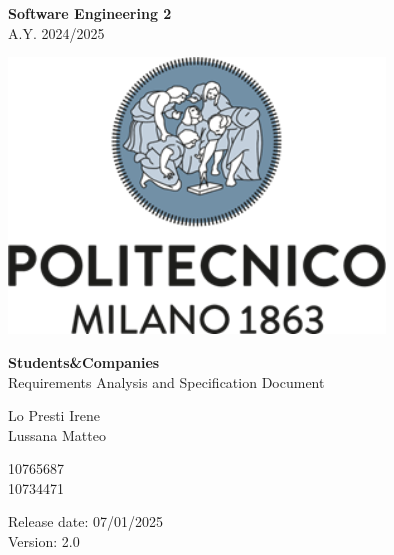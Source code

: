 \documentclass{config/PoliMi3i_thesis}
\numberwithin{algorithm}{chapter}
\begin{document}
%
\fancyhf{} %
\fancyhead[RO,RE]{\thepage} %

\begin{titlepage}

\centering
{\bfseries\LARGE Software Engineering 2\\ 
\vskip0.2cm
}
 \large A.Y. 2024/2025


\vskip1.5cm


\includegraphics[width=10cm]{Images/logopoliazzurro.png}\centering
\vskip2cm

     
\centering
{\bfseries \Huge Students\&Companies\\
\vskip0.5cm
}
\huge Requirements Analysis and Specification Document\\
\vskip1.5cm
\begin{minipage}[t]{0.45\textwidth} %
    \raggedleft %
        {\Large 
            Lo Presti Irene\\ 
            Lussana Matteo\\
        }
\end{minipage}%
\hfill %
\begin{minipage}[t]{0.45\textwidth} %
    \raggedright %
    {\Large 
        10765687 
        \\ 10734471 \\
    }
\end{minipage}

\vskip2cm
\raggedright\large{
 Release date: 07/01/2025\\
 Version: 2.0}


\end{titlepage}

\pagebreak
\end{document}
